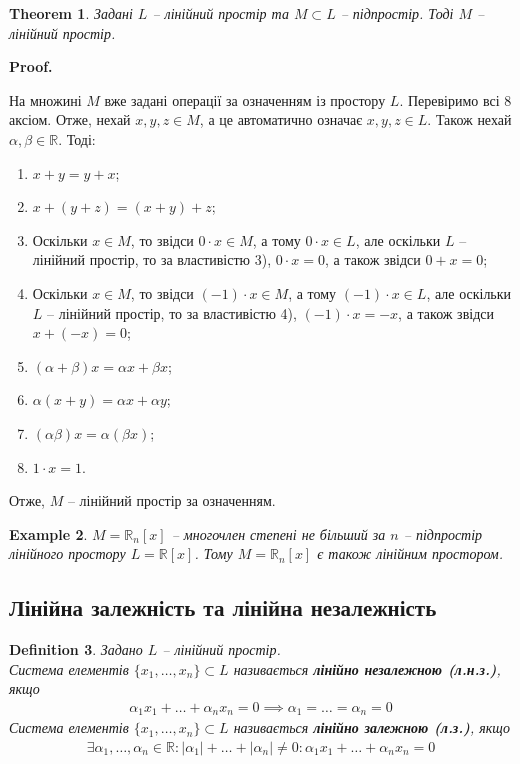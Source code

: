 \documentclass[a4paper, 10pt]{article}
\makeatletter
\theoremstyle{theoremdd}
\newtheorem{theorem}{Theorem}[subsection]
\newtheorem{definition}[theorem]{Definition}
\newtheorem{example}[theorem]{Example}
\renewenvironment{proof}[1][Proof.\\]{\par
\pushQED{\hfill \qed}%
\normalfont \topsep6\p@\@plus6\p@\relax
\trivlist
\item\relax
{\bfseries
#1\@addpunct{.}}\hspace\labelsep\ignorespaces
}{%
\popQED\endtrivlist\@endpefalse
}
\makeatother
\begin{document}
	\begin{theorem}
	Задані $L$ -- лінійний простір та $M \subset L$ -- підпростір. Тоді $M$ -- лінійний простір.
	\end{theorem}
	
	\begin{proof}
	На множині $M$ вже задані операції за означенням із простору $L$. Перевіримо всі 8 аксіом. Отже, нехай $x,y,z \in M$, а це автоматично означає $x,y,z \in L$. Також нехай $\alpha,\beta \in \mathbb{R}$. Тоді:
	\begin{enumerate}[wide = 0pt, nosep, label={\arabic*)}]
	\item $x+y=y+x$;
	\item $x+(y+z)=(x+y)+z$;
	\item Оскільки $x \in M$, то звідси $0\cdot x \in M$, а тому $0 \cdot x \in L$, але оскільки $L$ -- лінійний простір, то за властивістю 3), $0 \cdot x = 0$, а також звідси $0 + x = 0$;
	\item Оскільки $x \in M$, то звідси $(-1) \cdot x \in M$, а тому $(-1) \cdot x \in L$, але оскільки $L$ -- лінійний простір, то за властивістю 4), $(-1) \cdot x = -x$, а також звідси $x + (-x) = 0$;
	\item $(\alpha + \beta)x = \alpha x + \beta x$;
	\item $\alpha (x+y)= \alpha x + \alpha y$;
	\item $(\alpha \beta) x = \alpha (\beta x)$;
	\item $1 \cdot x = 1$.
	\end{enumerate}
	Отже, $M$ -- лінійний простір за означенням.
	\end{proof}

	\begin{example}	
		$M = \mathbb{R}_n[x]$ -- многочлен степені не більший за $n$ -- підпростір лінійного простору $L = \mathbb{R}[x]$. Тому $M = \mathbb{R}_n[x]$ є також лінійним простором.
	\end{example}
	
	\subsection{Лінійна залежність та лінійна незалежність}
	\begin{definition}
	Задано $L$ -- лінійний простір.\\
	Система елементів $\{x_1, \dots, x_n\} \subset L$ називається \textbf{лінійно незалежною (л.н.з.)}, якщо
	\begin{align*}
	\alpha_1 x_1 + \dots + \alpha_n x_n = 0 \implies \alpha_1 = \dots = \alpha_n = 0
	\end{align*}
	Система елементів $\{x_1, \dots, x_n\} \subset L$ називається \textbf{лінійно залежною (л.з.)}, якщо
	\begin{align*}
	\exists \alpha_1,\dots,\alpha_n \in \mathbb{R}: |\alpha_1| + \dots + |\alpha_n| \neq 0: \alpha_1 x_1 + \dots + \alpha_n x_n = 0
	\end{align*}
	\end{definition}
	
\end{document}
